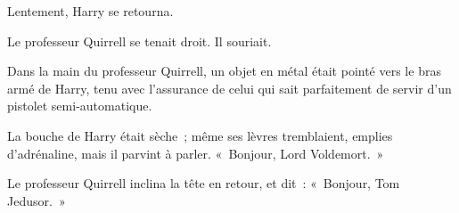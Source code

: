 Lentement, Harry se retourna.

Le professeur Quirrell se tenait droit.
Il souriait.

Dans la main du professeur Quirrell, un objet en métal était pointé vers le bras armé de Harry, tenu avec l'assurance de celui qui sait parfaitement de servir d'un pistolet semi-automatique.

La bouche de Harry était sèche~; même ses lèvres tremblaient, emplies d'adrénaline, mais il parvint à parler.
«~Bonjour, Lord Voldemort.~»

Le professeur Quirrell inclina la tête en retour, et dit~: «~Bonjour, Tom Jedusor.~»
